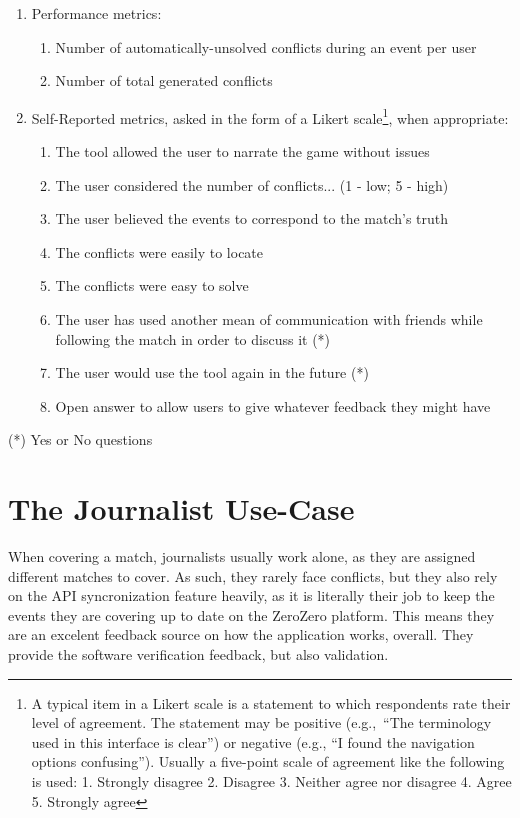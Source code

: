 \begin{enumerate}
    \item Performance metrics:
    \begin{enumerate}
        \item Number of automatically-unsolved conflicts during an event per user
        \item Number of total generated conflicts
    \end{enumerate}
    \item Self-Reported metrics, asked in the form of a Likert scale\footnote{A typical item in a Likert scale is a statement to which respondents rate
    their level of agreement. The statement may be positive (e.g.,\ “The terminology used in this interface is clear”) or negative (e.g., “I found the navigation options confusing”). Usually a five-point scale of agreement like the following is used: 1. Strongly disagree 2. Disagree 3. Neither agree nor disagree 4. Agree 5. Strongly agree}, when appropriate:
    \begin{enumerate}
        \item The tool allowed the user to narrate the game without issues
        \item The user considered the number of conflicts... (1 - low; 5 - high)
        \item The user believed the events to correspond to the match's truth 
        \item The conflicts were easily to locate
        \item The conflicts were easy to solve \\
        \item The user has used another mean of communication with friends while following the match in order to discuss it (*) 
        \item The user would use the tool again in the future (*) \\
        \item Open answer to allow users to give whatever feedback they might have
    \end{enumerate}
\end{enumerate}

(*) Yes or No questions

\section{The Journalist Use-Case}
When covering a match, journalists usually work alone, as they are assigned different matches to cover. As such, they rarely face conflicts, but they also rely on the API syncronization feature heavily, as it is literally their job to keep the events they are covering up to date on the ZeroZero platform. This means they are an excelent feedback source on how the application works, overall. They provide the software verification feedback, but also validation.

